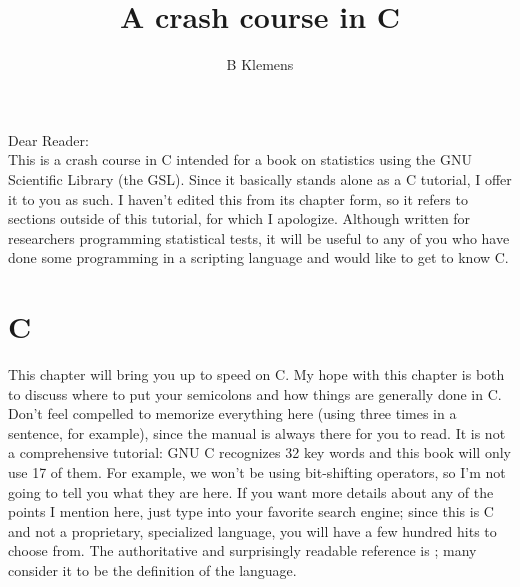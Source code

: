 \documentclass[12pt]{article}
\begin{document}
	\title{A crash course in C}
	\author{B Klemens}
	\maketitle


Dear Reader:\\
This is a crash course in C intended for a book on statistics using the
GNU Scientific Library (the GSL).  Since it basically stands alone as a
C tutorial, I offer it to you as such. I haven't edited this from
its chapter form, so it refers to sections outside of this tutorial,
for which I apologize. Although written for researchers programming
statistical tests, it will be useful to any of you who have done some
programming in a scripting language and would like to get to know C.

\vskip 1cm

\section{C}
\fi


\long{}



This chapter will bring you up to speed on C.  
My hope with this chapter is both to discuss where to put your semicolons
and how things are generally done in C. Don't feel compelled to memorize
everything here (using  three times in a sentence, for
example), since the manual is always there for you to read.  It is not
a comprehensive tutorial: GNU C recognizes 32 key words and this book
will only use 17 of them. For example, we won't be using bit-shifting
operators, so I'm not going to tell you what they are here.  If you want
more details about any of the points I mention here, just type  into your favorite search engine; since this is C and not a
proprietary, specialized language, you will have a few hundred hits to
choose from. The authoritative and surprisingly readable reference
is \cite{kandr:c}; many consider it to be the definition of the language.
\end{document}
